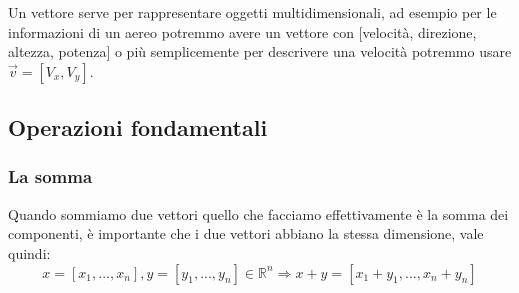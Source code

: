 \documentclass[../main.tex]{subfiles}
\begin{document}
Un vettore serve per rappresentare oggetti multidimensionali, ad esempio per le informazioni di un aereo potremmo avere un vettore con [velocità, direzione, altezza, potenza] o più semplicemente per descrivere una velocità potremmo usare $\vec{v} = [V_x, V_y]$.

\subsection{Operazioni fondamentali}
\subsubsection{La somma}
Quando sommiamo due vettori quello che facciamo effettivamente è la somma dei componenti, è importante che i due vettori abbiano la stessa dimensione, vale quindi:
$$
    x=[x_1,...,x_n], y=[y_1,...,y_n]\in \mathbb{R}^n \Rightarrow 
    x+y=[x_1+y_1,...,x_n+y_n]
$$
\end{document}
